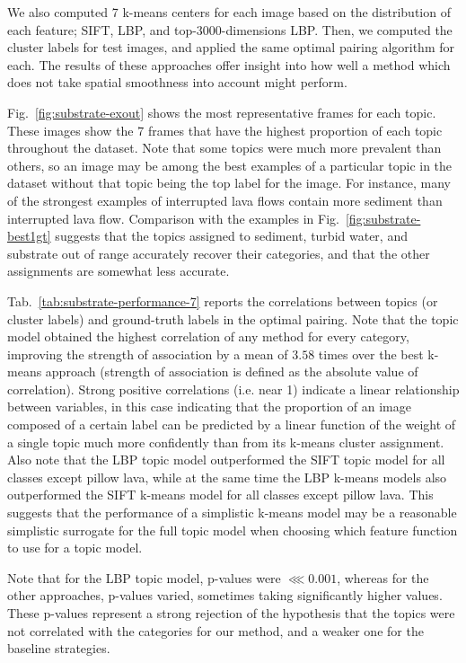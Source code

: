We also computed 7 k-means centers for each image based on the distribution of each feature; SIFT, LBP, and top-3000-dimensions LBP. Then, we computed the cluster labels for test images, and applied the same optimal pairing algorithm for each. The results of these approaches offer insight into how well a method which does not take spatial smoothness into account might perform.

Fig.~\ref{fig:substrate-exout} shows the most representative frames for each topic. These images show the 7 frames that have the highest proportion of each topic throughout the dataset. Note that some topics were much more prevalent than others, so
an image may be among the best examples of a particular topic in the dataset without that topic being the top label for
the image. For instance, many of the strongest examples of interrupted lava flows contain more sediment than interrupted
lava flow. Comparison with the examples in Fig.~\ref{fig:substrate-best1gt} suggests that the topics assigned
to sediment, turbid water, and substrate out of range accurately recover their categories, and that the
other assignments are somewhat less accurate.

Tab.~\ref{tab:substrate-performance-7} reports the correlations between topics (or cluster labels) and ground-truth labels in the optimal pairing. Note that the topic model obtained the highest correlation of any method for every category, improving the strength of association by a mean of $3.58$ times over the best k-means approach (strength of association is defined as the absolute value of correlation). Strong positive correlations (i.e. near 1) indicate a linear relationship between variables, in this case indicating that the proportion of an image composed of a certain label can be predicted by a linear function of the weight of a single topic much more confidently than from its k-means cluster assignment. Also note that the LBP topic model outperformed the SIFT topic model for all classes except pillow lava, while at the same time the LBP k-means models also outperformed the SIFT k-means model for all classes except pillow lava. This suggests that the performance of a simplistic k-means model may be a reasonable simplistic surrogate for the full topic model when choosing which feature function to use for a topic model.

Note that for the LBP topic model, p-values were $ \lll 0.001 $, whereas for the other approaches, p-values varied, sometimes taking significantly higher values.
These p-values represent a strong rejection of the hypothesis that the topics were not correlated with the categories for our method, and a weaker one for the baseline strategies.

